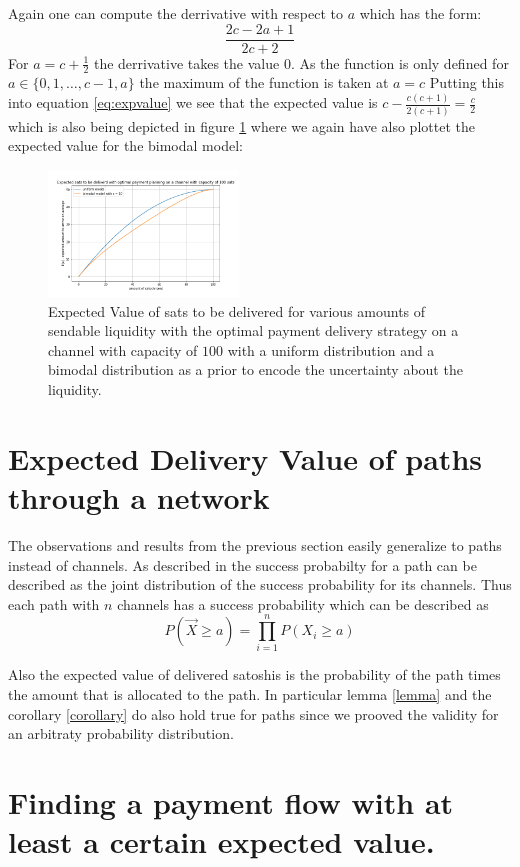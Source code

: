 \documentclass[10pt,twocolumn]{article}
\begin{document}
Again one can compute the derrivative with respect to $a$ which has the form:
\[
\frac{2c-2a+1}{2c+2}
\]
For $a=c+\frac{1}{2}$ the derrivative takes the value $0$.
As the function is only defined for $a\in\{0,1,\dots,c-1,a\}$ the maximum of the function is taken at $a=c$
Putting this into equation \ref{eq:expvalue} we see that the expected value is $c-\frac{c(c+1)}{2(c+1)} = \frac{c}{2}$  which is also being depicted in figure \ref{fig:optimalPaymentSingleChannel} where we again have also plottet the expected value for the bimodal model:

\begin{figure}[htpb]
  \center
  \includegraphics[width=0.45\textwidth]{img/optimalPaymentSingleChannel}
  \caption{Expected Value of sats to be delivered for various amounts of sendable liquidity with the optimal payment delivery strategy on a channel with capacity of $100$ with a uniform distribution and a bimodal distribution as a prior to encode the uncertainty about the liquidity.}
  \label{fig:optimalPaymentSingleChannel}
\end{figure}

\section{Expected Delivery Value of paths through a network}
The observations and results from the previous section easily generalize to paths instead of channels.
As described in \cite{pickhardt2021security} the success probabilty for a path can be described as the joint distribution of the success probability for its channels.
Thus each path with $n$ channels has a success probability which can be described as
\[
P(\vec{X} \geq a) = \prod_{i=1}^n P(X_i \geq a)
\]

Also the expected value of delivered satoshis is the probability of the path times the amount that is allocated to the path.
In particular lemma \ref{lemma} and the corollary \ref{corollary} do also hold true for paths since we prooved the validity for an arbitraty probability distribution.

\section{Finding a payment flow with at least a certain expected value.}
\end{document}
